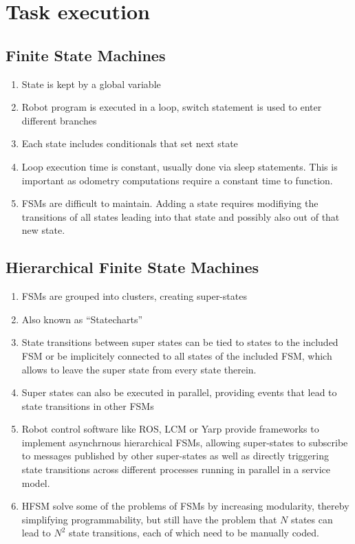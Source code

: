 \chapter{Task execution}

\section{Finite State Machines}

\begin{enumerate}
\item State is kept by a global variable
\item Robot program is executed in a loop, switch statement is used to enter different branches
\item Each state includes conditionals that set next state
\item Loop execution time is constant, usually done via sleep statements. This is important as odometry computations require a constant time to function.
\item FSMs are difficult to maintain. Adding a state requires modifiying the transitions of all states leading into that state and possibly also out of that new state.
\end{enumerate}

\section{Hierarchical Finite State Machines}
\begin{enumerate}
\item FSMs are grouped into clusters, creating super-states
\item Also known as ``Statecharts'' \cite{harel1987statecharts}

\item State transitions between super states can be tied to states to the included FSM or be implicitely connected to all states of the included FSM, which allows to leave the super state from every state therein.
\item Super states can also be executed in parallel, providing  events that lead to state transitions in other FSMs
\item Robot control software like ROS, LCM or Yarp provide frameworks to implement asynchrnous hierarchical FSMs, allowing super-states to subscribe to messages published by other super-states as well as directly triggering state transitions across different processes running in parallel in a service model.
\item HFSM solve some of the problems of FSMs by increasing modularity, thereby simplifying programmability, but still have the problem that $N$ states can lead to $N^2$ state transitions, each of which need to be manually coded.
\end{enumerate}

